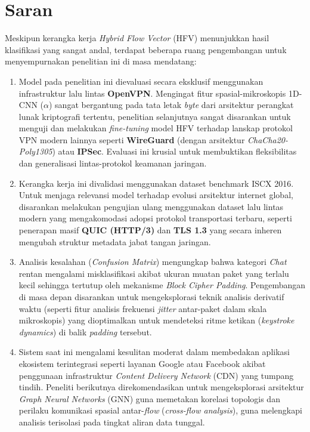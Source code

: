 \section{Saran}
\label{sec:saran}

Meskipun kerangka kerja \textit{Hybrid Flow Vector} (HFV) menunjukkan hasil klasifikasi yang sangat andal, terdapat beberapa ruang pengembangan untuk menyempurnakan penelitian ini di masa mendatang:

\begin{enumerate}
    \item Model pada penelitian ini dievaluasi secara eksklusif menggunakan infrastruktur lalu lintas \textbf{OpenVPN}. Mengingat fitur spasial-mikroskopis 1D-CNN ($\alpha$) sangat bergantung pada tata letak \textit{byte} dari arsitektur perangkat lunak kriptografi tertentu, penelitian selanjutnya sangat disarankan untuk menguji dan melakukan \textit{fine-tuning} model HFV terhadap lanskap protokol VPN modern lainnya seperti \textbf{WireGuard} (dengan arsitektur \textit{ChaCha20-Poly1305}) atau \textbf{IPSec}. Evaluasi ini krusial untuk membuktikan fleksibilitas dan generalisasi lintas-protokol keamanan jaringan.

    \item Kerangka kerja ini divalidasi menggunakan dataset benchmark ISCX 2016. Untuk menjaga relevansi model terhadap evolusi arsitektur internet global, disarankan melakukan pengujian ulang menggunakan dataset lalu lintas modern yang mengakomodasi adopsi protokol transportasi terbaru, seperti penerapan masif \textbf{QUIC (HTTP/3)} dan \textbf{TLS 1.3} yang secara inheren mengubah struktur metadata jabat tangan jaringan.

    \item Analisis kesalahan (\textit{Confusion Matrix}) mengungkap bahwa kategori \textit{Chat} rentan mengalami misklasifikasi akibat ukuran muatan paket yang terlalu kecil sehingga tertutup oleh mekanisme \textit{Block Cipher Padding}. Pengembangan di masa depan disarankan untuk mengeksplorasi teknik analisis derivatif waktu (seperti fitur analisis frekuensi \textit{jitter} antar-paket dalam skala mikroskopis) yang dioptimalkan untuk mendeteksi ritme ketikan (\textit{keystroke dynamics}) di balik \textit{padding} tersebut.

    \item Sistem saat ini mengalami kesulitan moderat dalam membedakan aplikasi ekosistem terintegrasi seperti layanan Google atau Facebook akibat penggunaan infrastruktur \textit{Content Delivery Network} (CDN) yang tumpang tindih. Peneliti berikutnya direkomendasikan untuk mengeksplorasi arsitektur \textit{Graph Neural Networks} (GNN) guna memetakan korelasi topologis dan perilaku komunikasi spasial antar-\textit{flow} (\textit{cross-flow analysis}), guna melengkapi analisis terisolasi pada tingkat aliran data tunggal.
\end{enumerate}